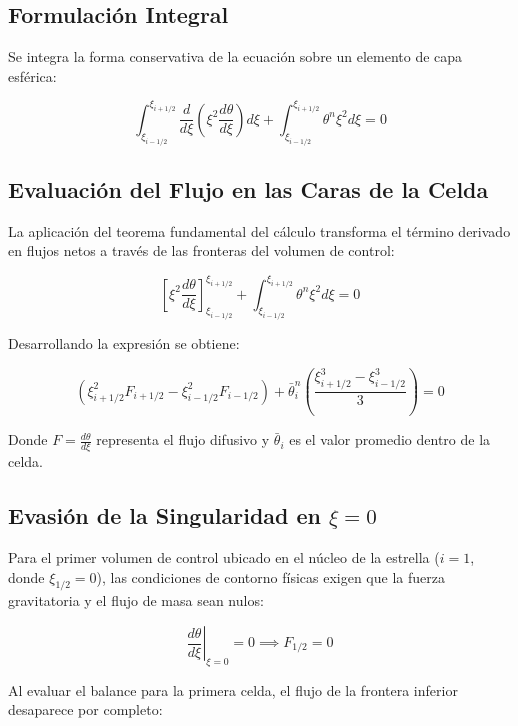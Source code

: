 \documentclass[11pt, lettersize]{article}
\begin{document}
	\subsection{Formulación Integral}
	Se integra la forma conservativa de la ecuación sobre un elemento de capa esférica:
	
	\begin{equation}
		\int_{\xi_{i-1/2}}^{\xi_{i+1/2}} \frac{d}{d\xi} \left( \xi^2 \frac{d\theta}{d\xi} \right) d\xi + \int_{\xi_{i-1/2}}^{\xi_{i+1/2}} \theta^n \xi^2 d\xi = 0
	\end{equation}
	
	\subsection{Evaluación del Flujo en las Caras de la Celda}
	La aplicación del teorema fundamental del cálculo transforma el término derivado en flujos netos a través de las fronteras del volumen de control:
	
	\begin{equation}
		\left[ \xi^2 \frac{d\theta}{d\xi} \right]_{\xi_{i-1/2}}^{\xi_{i+1/2}} + \int_{\xi_{i-1/2}}^{\xi_{i+1/2}} \theta^n \xi^2 d\xi = 0
	\end{equation}
	
	Desarrollando la expresión se obtiene:
	
	\begin{equation}
		\left( \xi_{i+1/2}^2 F_{i+1/2} - \xi_{i-1/2}^2 F_{i-1/2} \right) + \bar{\theta}_i^n \left( \frac{\xi_{i+1/2}^3 - \xi_{i-1/2}^3}{3} \right) = 0
	\end{equation}
	
	Donde $F = \frac{d\theta}{d\xi}$ representa el flujo difusivo y $\bar{\theta}_i$ es el valor promedio dentro de la celda.
	
	\subsection{Evasión de la Singularidad en $\xi = 0$}
	Para el primer volumen de control ubicado en el núcleo de la estrella ($i=1$, donde $\xi_{1/2} = 0$), las condiciones de contorno físicas exigen que la fuerza gravitatoria y el flujo de masa sean nulos:
	
	\begin{equation}
		\left. \frac{d\theta}{d\xi} \right|_{\xi=0} = 0 \implies F_{1/2} = 0
	\end{equation}
	
	Al evaluar el balance para la primera celda, el flujo de la frontera inferior desaparece por completo:
	
\end{document}
